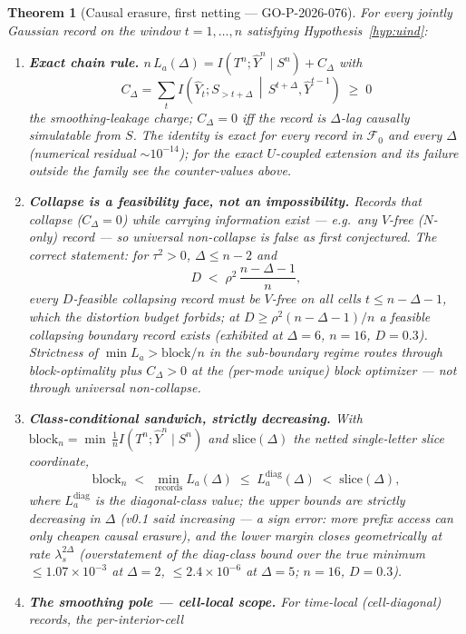 \documentclass[11pt]{article}
\newtheorem{theorem}{Theorem}
\theoremstyle{definition}
\theoremstyle{remark}
\begin{document}
\begin{theorem}[Causal erasure, first netting --- GO-P-2026-076]
\label{thm:main}
For every jointly Gaussian record on the window $t=1,\dots,n$
satisfying Hypothesis~\ref{hyp:uind}:
\begin{enumerate}
\item[(i)] \textbf{Exact chain rule.}
$n\,L_a(\Delta)=I(T^n;\hat Y^n\mid S^n)+C_\Delta$ with
\[
C_\Delta=\sum_t I\!\left(\hat Y_t;S_{>t+\Delta}\,\middle|\,
S^{t+\Delta},\hat Y^{t-1}\right)\;\ge\;0
\]
the \emph{smoothing-leakage charge}; $C_\Delta=0$ iff the record is
$\Delta$-lag causally simulatable from $S$. The identity is exact
for every record in $\mathcal F_0$ and every $\Delta$ (numerical
residual $\sim10^{-14}$); for the exact $U$-coupled extension and
its failure outside the family see the counter-values above.
\item[(ii)] \textbf{Collapse is a feasibility face, not an
impossibility.} Records that collapse ($C_\Delta=0$) while carrying
information exist --- e.g.\ any $V$-free ($N$-only) record --- so
universal non-collapse is \emph{false as first conjectured}. The
correct statement: for $\tau^2>0$, $\Delta\le n-2$ and
\[
D\;<\;\rho^2\,\frac{n-\Delta-1}{n},
\]
every $D$-feasible collapsing record must be $V$-free on all cells
$t\le n-\Delta-1$, which the distortion budget forbids; at
$D\ge\rho^2(n-\Delta-1)/n$ a feasible collapsing boundary record
exists (exhibited at $\Delta=6$, $n=16$, $D=0.3$). Strictness of
$\min L_a>\mathrm{block}/n$ in the sub-boundary regime routes
through block-optimality plus $C_\Delta>0$ at the (per-mode unique)
block optimizer --- not through universal non-collapse.
\item[(iii)] \textbf{Class-conditional sandwich, strictly
decreasing.} With $\mathrm{block}_n=\min\,\tfrac1nI(T^n;\hat
Y^n\mid S^n)$ and $\mathrm{slice}(\Delta)$ the netted single-letter
slice coordinate,
\[
\mathrm{block}_n\;<\;\min_{\text{records}} L_a(\Delta)\;\le\;
L_a^{\mathrm{diag}}(\Delta)\;<\;\mathrm{slice}(\Delta),
\]
where $L_a^{\mathrm{diag}}$ is the diagonal-class value; the upper
bounds are \emph{strictly decreasing in $\Delta$} (v0.1 said
increasing --- a sign error: more prefix access can only cheapen
causal erasure), and the lower margin closes geometrically at rate
$\lambda_s^{2\Delta}$ (overstatement of the diag-class bound over
the true minimum $\le1.07\times10^{-3}$ at $\Delta=2$,
$\le2.4\times10^{-6}$ at $\Delta=5$; $n=16$, $D=0.3$).
\item[(iv)] \textbf{The smoothing pole --- cell-local scope.} For
\emph{time-local} (cell-diagonal) records, the per-interior-cell

\end{enumerate}
\end{theorem}
\end{document}
